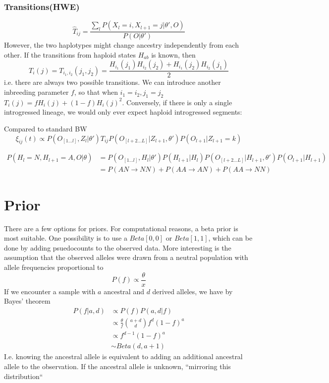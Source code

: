 \documentclass[10pt,a4paper]{article}
\begin{document}
\subsubsection{Transitions(HWE)}
$$\hat{T}_{ij} = \frac{\sum_l P(X_l=i, X_{l+1}=j| \theta', O)}{ P(O | \theta')}$$
However, the two haplotypes might change ancestry independently from each other. If the transitions from haploid states $H_{ab}$ is known, then 
$$T_i(j) = T_{i_1, i_2}(j_1, j_2) = \frac{H_{i_1}(j_1)H_{i_2}(j_2) + H_{i_1}(j_2)H_{i_2}(j_1)}{2}$$
i.e. there are always two possible transitions. We can introduce another inbreeding parameter $f$, so that when $i_1=i_2, j_1=j_2$ 
$T_i(j) = f H_i(j) + (1-f) H_i(j)^2$. Conversely, if there is only a single introgressed lineage, we would only ever expect haploid introgressed segments:



Compared to standard BW
$$\xi_{ij}(t) \propto P(O_{[1\dots l]}, Z_l | \theta') T_{ij}  P(O_{[l+2\dots L]}|Z_{l+1}, \theta') P(O_{l+1}|Z_{l+1}=k)$$

\begin{align}
P(H_l = N, H_{l+1} = A, O |\theta) &=  P(O_{[1\dots l]}, H_l | \theta') P(H_{l+1} | H_l) P(O_{[l+2\dots L]}|H_{l+1}, \theta') P(O_{l+1}|H_{l+1})\\
&=P(AN \to NN) + P(AA \to AN) + P(AA \to NN)
\end{align}




\section{Prior}
There are a few options for priors. For computational reasons, a beta prior is most suitable.
One possibility is to use a $Beta[0,0]$ or $Beta[1,1]$, which can be done by adding psuedocounts to the observed data.
More interesting is the assumption that the observed alleles were drawn from a neutral population with allele frequencies proportional to 
\begin{equation}
P(f) \propto \frac{\theta}{x}
\end{equation}
If we encounter a sample with $a$ ancestral and $d$ derived alleles, we have by Bayes' theorem
\begin{align}
P(f | a, d) &\propto P(f) P(a, d|f) \nonumber\\
 &\propto \frac{\theta}{f} \binom{a+d}{d} f^d (1-f)^a \nonumber\\
 &\propto f^{d-1} (1-f)^a \nonumber\\
&\sim Beta(d, a+1)
\end{align}
I.e. knowing the ancestral allele is equivalent to adding an additional ancestral allele to the observation. If the ancestral allele is unknown, ``mirroring this distribution``
\end{document}
